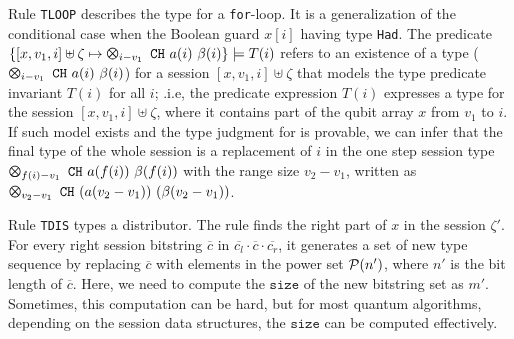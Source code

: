 Rule \texttt{TLOOP} describes the type for a \texttt{for}-loop.
It is a generalization of the conditional case when the Boolean guard $x[i]$ having type \texttt{Had}.
The predicate
$\{[x,v_1,i] \uplus \zeta   \mapsto \ttype{i-v_1}{\tch{a(i)}{\beta(i)}}\}\models T(i)$
refers to an existence of a type ($\ttype{i-v_1}{\tch{a(i)}{\beta(i)}}$) for a session $[x,v_1,i] \uplus \zeta$
that models the type predicate invariant $T(i)$ for all $i$; .i.e,
the predicate expression $T(i)$ expresses a type for the session $[x,v_1,i] \uplus \zeta$,
where it contains part of the qubit array $x$ from $v_1$ to $i$.
If such model exists and the type judgment for  is provable,
we can infer that the final type of the whole session is a replacement of $i$ in
the one step session type $\ttype{f(i)-v_1}{\tch{a(f(i))}{\beta(f(i))}}$
with the range size $v_2 -v_1$, written as $\ttype{v_2-v_1}{\tch{(a(v_2-v_1))}{(\beta(v_2-v_1))}}$.

Rule \texttt{TDIS} types a distributor.
The rule finds the right part of $x$ in the session $\zeta'$.
For every right session bitstring $\overline{c}$ in $\overline{c_l}\cdot\overline{c}\cdot\overline{c_r}$,
it generates a set of new type sequence by replacing $\overline{c}$ with elements in the power set $\mathcal{P}(n')$, 
where $n'$ is the bit length of $\overline{c}$.
Here, we need to compute the $\texttt{size}$ of the new bitstring set as $m'$.
Sometimes, this computation can be hard, but for most quantum algorithms,
depending on the session data structures, the $\texttt{size}$ can be computed effectively.


